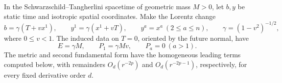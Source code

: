 \begin{lemma}
\label{q:converse:lem:boost}
In the Schwarzschild--Tangherlini spacetime of geometric mass $M>0$,
let $b,y$ be static time and isotropic spatial coordinates.  Make the
Lorentz change
\begin{equation}\label{q:converse:eq:boost-coordinates}
 b=\gamma(T+vx^1),\qquad y^1=\gamma(x^1+vT),\qquad
 y^a=x^a\ (2\le a\le n),\qquad \gamma=(1-v^2)^{-1/2},
\end{equation}
where $0\le v<1$.  The induced data on $T=0$, oriented by the
future normal, have
\begin{equation}\label{q:converse:eq:boost-charges}
 E=\gamma M,\qquad P_1=\gamma Mv,\qquad P_a=0\ (a>1).
\end{equation}
The metric and second fundamental form have the homogeneous leading
terms computed below, with remainders $O_d(r^{-2p})$ and
$O_d(r^{-2p-1})$, respectively, for every fixed derivative order $d$.
\end{lemma}

